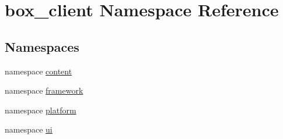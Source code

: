 \hypertarget{namespacebox__client}{
\section{box\_\-client Namespace Reference}
\label{namespacebox__client}
}
\subsection*{Namespaces}
\begin{DoxyCompactItemize}
\item 
namespace \hyperlink{namespacebox__client_1_1content}{content}
\item 
namespace \hyperlink{namespacebox__client_1_1framework}{framework}
\item 
namespace \hyperlink{namespacebox__client_1_1platform}{platform}
\item 
namespace \hyperlink{namespacebox__client_1_1ui}{ui}
\end{DoxyCompactItemize}
